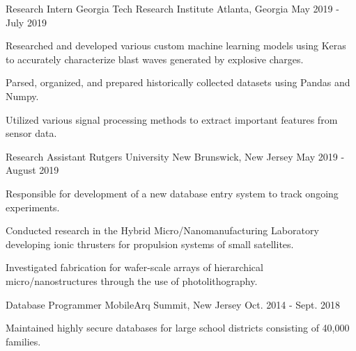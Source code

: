 \begin{cventries}
\vspace{-1mm}
    \cventry
    {Research Intern}
    {Georgia Tech Research Institute}
    {Atlanta, Georgia}
    {May 2019 - July 2019}
    {
      \begin{cvitems}
        \item {Researched and developed various custom machine learning models using Keras to accurately characterize blast waves generated by explosive charges.}
             \vspace{1mm}
        \item {Parsed, organized, and prepared historically collected datasets using Pandas and Numpy.}
             \vspace{1mm}
        \item {Utilized various signal processing methods to extract important features from sensor data.}
      \end{cvitems}
    }
    \vspace{-0.5mm}
    \cventry
    {Research Assistant}
    {Rutgers University}
    {New Brunswick, New Jersey}
    {May 2019 - August 2019}
    {
      \begin{cvitems}
        \item {Responsible for development of a new database entry system to track ongoing experiments.}
             \vspace{1mm}
        \item {Conducted research in the Hybrid Micro/Nanomanufacturing Laboratory developing ionic thrusters for propulsion systems of small satellites.}
             \vspace{1mm}
        \item {Investigated fabrication for wafer-scale arrays of hierarchical micro/nanostructures through the use of photolithography.}
      \end{cvitems}
    }
        \vspace{-0.5mm}
  \cventry
    {Database Programmer}
    {MobileArq}
    {Summit, New Jersey}
    {Oct. 2014 - Sept. 2018}
    {
      \begin{cvitems}
        \item {Maintained highly secure databases for large school districts consisting of 40,000 families.}

\end{cvitems}}
\end{cventries}
